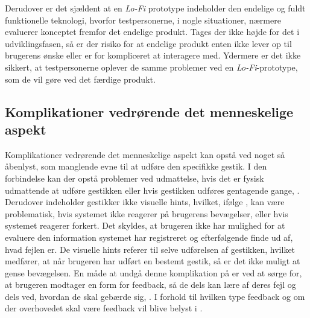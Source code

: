Derudover er det sjældent at en \textit{Lo-Fi} prototype indeholder den endelige og fuldt funktionelle teknologi, hvorfor testpersonerne, i nogle situationer, nærmere evaluerer konceptet fremfor det endelige produkt. Tages der ikke højde for det i udviklingsfasen, så er der risiko for at endelige produkt enten ikke lever op til brugerens ønske eller er for kompliceret at interagere med. Ydermere er det ikke sikkert, at testpersonerne oplever de samme problemer ved en \textit{Lo-Fi}-prototype, som de vil gøre ved det færdige produkt.   
%
\subsection{Komplikationer vedrørende det menneskelige aspekt}
\label{KomplikationerVedroerendeDetMenneskelige}
%
Komplikationer vedrørende det menneskelige aspekt kan opstå ved noget så åbenlyst, som manglende evne til at udføre den specifikke gestik. I den forbindelse kan der opstå problemer ved udmattelse, hvis det er fysisk udmattende at udføre gestikken eller hvis gestikken udføres gentagende gange, \parencite[s. 28]{PDF:ATaxonomyOfGestures}. Derudover indeholder gestikker ikke visuelle hints, hvilket, ifølge \textcite[s. 6]{PDF:NaturalUserInterfaces}, kan være problematisk, hvis systemet ikke reagerer på brugerens bevægelser, eller hvis systemet reagerer forkert. Det skyldes, at brugeren ikke har mulighed for at evaluere den information systemet har registreret og efterfølgende finde ud af, hvad fejlen er. De visuelle hints referer til selve udførelsen af gestikken, hvilket medfører, at når brugeren har udført en bestemt gestik, så er det ikke muligt at gense bevægelsen. En måde at undgå denne komplikation på er ved at sørge for, at brugeren modtager en form for feedback, så de dels kan lære af deres fejl og dels ved, hvordan de skal gebærde sig, \parencite[s. 10]{PDF:NaturalUserInterfaces}. I forhold til hvilken type feedback og om der overhovedet skal være feedback vil blive belyst i . \blankline
%
